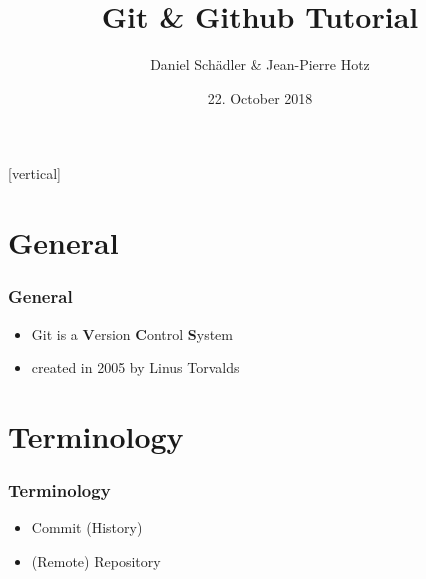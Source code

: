 \documentclass{beamer}
\begin{document}
	\title{Git \& Github Tutorial}   
	\author{Daniel Schädler \& Jean-Pierre Hotz} 
	\date{22. October 2018}
	
	\subtitle{} %
	\subject{Software-Engineering}%
	\keywords{}%
	
	[vertical]
	
	\begin{frame}
		\titlepage
	\end{frame}
	
	\begin{frame}
		\tableofcontents
	\end{frame}

	\section{General}
	\begin{frame}
		\frametitle{General}\pause
		\begin{itemize}
			\item Git is a \textbf{V}ersion \textbf{C}ontrol \textbf{S}ystem \pause
			\item created in 2005 by Linus Torvalds
		\end{itemize}
	\end{frame}

	\section{Terminology}
	\begin{frame}
		\frametitle{Terminology}\pause
		\begin{itemize}
			\item Commit (History) \pause
			\item (Remote) Repository
		\end{itemize}
	\end{frame}
\end{document}
